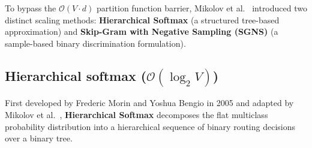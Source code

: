\documentclass[../../main.tex]{subfiles}
\begin{document}
To bypass the $\mathcal{O}(V \cdot d)$ partition function barrier, Mikolov et al.~\cite{mikolov2013distributed} introduced two distinct scaling methods: \textbf{Hierarchical Softmax} (a structured tree-based approximation) and \textbf{Skip-Gram with Negative Sampling (SGNS)} (a sample-based binary discrimination formulation).

\subsection{Hierarchical softmax (\texorpdfstring{$\mathcal{O}(\log_2 V)$}{O(log2 V)})}
\label{subsec:hierarchical_softmax}

First developed by Frederic Morin and Yoshua Bengio in 2005 \cite{morin2005hierarchical} and adapted by Mikolov et al.~\cite{mikolov2013distributed}, \textbf{Hierarchical Softmax} decomposes the flat multiclass probability distribution into a hierarchical sequence of binary routing decisions over a binary tree.
\end{document}
